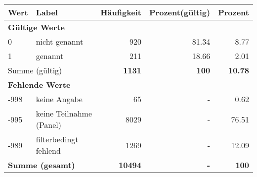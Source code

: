      \begin{longtable}{lXrrr}
     \toprule
     \textbf{Wert} & \textbf{Label} & \textbf{Häufigkeit} & \textbf{Prozent(gültig)} & \textbf{Prozent} \\
     \endhead
     \midrule
     \multicolumn{5}{l}{\textbf{Gültige Werte}}\\

     0 &
     \multicolumn{1}{X}{ nicht genannt   } &


       \num{920} &
       \num[round-mode=places,round-precision=2]{81,34} &
         \num[round-mode=places,round-precision=2]{8,77} \\

     1 &
     \multicolumn{1}{X}{ genannt   } &


       \num{211} &
       \num[round-mode=places,round-precision=2]{18,66} &
         \num[round-mode=places,round-precision=2]{2,01} \\
     \midrule
     \multicolumn{2}{l}{Summe (gültig)} &
       \textbf{\num{1131}} &
     \textbf{100} &
       \textbf{\num[round-mode=places,round-precision=2]{10,78}} \\
     \multicolumn{5}{l}{\textbf{Fehlende Werte}}\\
       -998 &
       keine Angabe &
         \num{65} &
        - &
         \num[round-mode=places,round-precision=2]{0,62} \\
       -995 &
       keine Teilnahme (Panel) &
         \num{8029} &
        - &
         \num[round-mode=places,round-precision=2]{76,51} \\
       -989 &
       filterbedingt fehlend &
         \num{1269} &
        - &
         \num[round-mode=places,round-precision=2]{12,09} \\
     \midrule
     \multicolumn{2}{l}{\textbf{Summe (gesamt)}} &
          \textbf{\num{10494}} &
        \textbf{-} &
        \textbf{100} \\
     \bottomrule
     \end{longtable}
     
